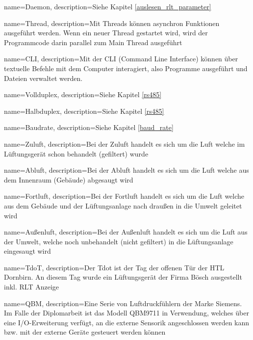 {
	name=Daemon,
	description={Siehe Kapitel \ref{auslesen_rlt_parameter} }
}

{
	name=Thread,
	description={Mit Threads können asynchron Funktionen ausgeführt werden. Wenn ein neuer Thread gestartet wird, wird der Programmcode darin parallel zum Main Thread ausgeführt}
}

{
	name=CLI,
	description={Mit der CLI (Command Line Interface) können über textuelle Befehle mit dem Computer interagiert, also Programme ausgeführt und Dateien verwaltet werden. \cite[vgl.][]{loshin_gillis:2022}}
}

{
	name=Vollduplex,
	description={Siehe Kapitel \ref{rs485} }
}

{
	name=Halbduplex,
	description={Siehe Kapitel \ref{rs485} }
}

{
	name=Baudrate,
	description={Siehe Kapitel \ref{baud_rate} }
}


{
	name=Zuluft,
	description={Bei der Zuluft handelt es sich um die Luft welche im Lüftungsgerät schon behandelt (gefiltert) wurde}
}

{
	name=Abluft,
	description={Bei der Abluft handelt es sich um die Luft welche aus dem Innenraum (Gebäude) abgesaugt wird}
}

{
	name=Fortluft,
	description={Bei der Fortluft handelt es sich um die Luft welche aus dem Gebäude und der Lüftungsanlage nach draußen in die Umwelt geleitet wird}
}

{
	name=Außenluft,
	description={Bei der Außenluft handelt es sich um die Luft aus der Umwelt, welche noch unbehandelt (nicht gefiltert) in die Lüftungsanlage eingesaugt wird}
}

{
	name=TdoT,
	description={Der Tdot ist der Tag der offenen Tür der HTL Dornbirn. An diesem Tag wurde ein Lüftungsgerät der Firma Bösch ausgestellt inkl. RLT Anzeige}
}

{
	name=QBM,
	description={Eine Serie von Luftdruckfühlern der Marke Siemens. Im Falle der Diplomarbeit ist das Modell QBM9711 in Verwendung, welches über eine I/O-Erweiterung verfügt, an die externe Sensorik angeschlossen werden kann bzw. mit der externe Geräte gesteuert werden können}
}

